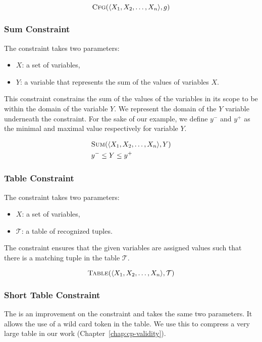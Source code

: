 \documentclass[../Document.tex]{subfiles}
\begin{document}
$$
    \mbox{\sc Cfg}(\langle X_1, X_2, \ldots, X_n \rangle, g)
$$

\subsubsection{Sum Constraint}
The \somme constraint takes two parameters:
\begin{itemize}
    \item $X$: a set of variables,
    \item $Y$: a variable that represents the sum of the values of variables $X$.
\end{itemize}

This constraint constrains the sum of the values of the variables in its scope to be within the domain of the variable $Y$.
We represent the domain of the $Y$ variable underneath the \somme constraint. For the sake of our example, we define $y^-$ and $y^+$ as the minimal and maximal value respectively for variable $Y$.

\begin{align*}
    &\mbox{\sc Sum}(\langle X_1, X_2, \ldots, X_n \rangle, Y)\\
    &y^- \leq Y \leq y^+
\end{align*}

\subsubsection{Table Constraint}
The \extensional constraint takes two parameters:
\begin{itemize}
    \item $X$: a set of variables,
    \item $\mathcal{T}$: a table of recognized tuples.
\end{itemize}

The \extensional constraint ensures that the given variables are assigned values such that there is a matching tuple in the table $\mathcal{T}$.

$$
    \mbox{\sc Table}(\langle X_1, X_2, \ldots, X_n \rangle, \mathcal{T})
$$

\subsubsection{Short Table Constraint}
The \shortTable is an improvement on the \extensional constraint and takes the same two parameters.
It allows the use of a wild card token in the table.
We use this to compress a very large table in our work (Chapter~\ref{chap:cp-validity}).
\end{document}
